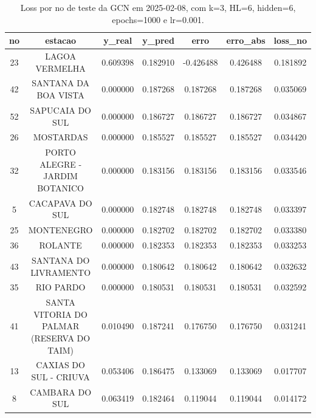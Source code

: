 \begin{table}[h]
\centering
\caption{Loss por no de teste da GCN em 2025-02-08, com k=3, HL=6, hidden=6, epochs=1000 e lr=0.001.}
\label{tab:gcn_loss_k3_hl6_h6_e1000_d20250208}
\begin{tabular}{ccccccc}
\toprule
no & estacao & y\_real & y\_pred & erro & erro\_abs & loss\_no \\
\midrule
23 & LAGOA VERMELHA & 0.609398 & 0.182910 & -0.426488 & 0.426488 & 0.181892 \\
42 & SANTANA DA BOA VISTA & 0.000000 & 0.187268 & 0.187268 & 0.187268 & 0.035069 \\
52 & SAPUCAIA DO SUL & 0.000000 & 0.186727 & 0.186727 & 0.186727 & 0.034867 \\
26 & MOSTARDAS & 0.000000 & 0.185527 & 0.185527 & 0.185527 & 0.034420 \\
32 & PORTO ALEGRE - JARDIM BOTANICO & 0.000000 & 0.183156 & 0.183156 & 0.183156 & 0.033546 \\
5 & CACAPAVA DO SUL & 0.000000 & 0.182748 & 0.182748 & 0.182748 & 0.033397 \\
25 & MONTENEGRO & 0.000000 & 0.182702 & 0.182702 & 0.182702 & 0.033380 \\
36 & ROLANTE & 0.000000 & 0.182353 & 0.182353 & 0.182353 & 0.033253 \\
43 & SANTANA DO LIVRAMENTO & 0.000000 & 0.180642 & 0.180642 & 0.180642 & 0.032632 \\
35 & RIO PARDO & 0.000000 & 0.180531 & 0.180531 & 0.180531 & 0.032592 \\
41 & SANTA VITORIA DO PALMAR (RESERVA DO TAIM) & 0.010490 & 0.187241 & 0.176750 & 0.176750 & 0.031241 \\
13 & CAXIAS DO SUL - CRIUVA & 0.053406 & 0.186475 & 0.133069 & 0.133069 & 0.017707 \\
8 & CAMBARA DO SUL & 0.063419 & 0.182464 & 0.119044 & 0.119044 & 0.014172 \\
\bottomrule
\end{tabular}
\end{table}
